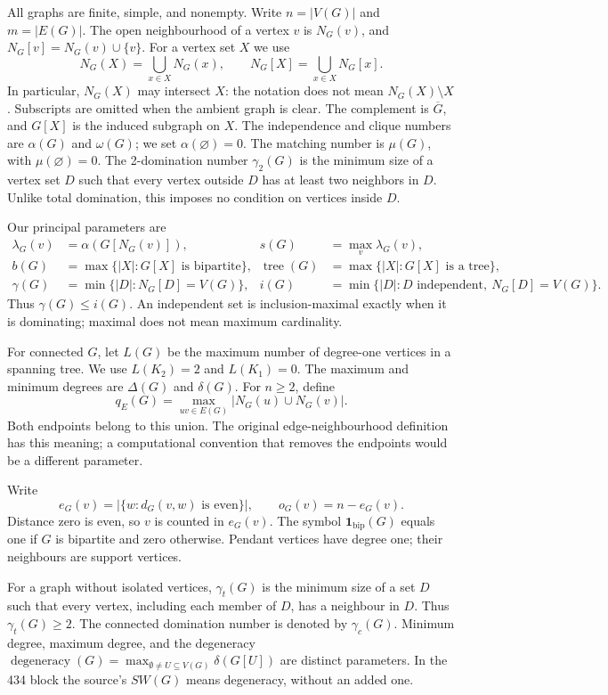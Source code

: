 \documentclass[11pt,a4paper]{article}
\theoremstyle{remark}
\newcommand{\tree}{\operatorname{tree}}
\newcommand{\bip}{\mathbf{1}_{\mathrm{bip}}}
\begin{document}
All graphs are finite, simple, and nonempty. Write $n=|V(G)|$ and
$m=|E(G)|$. The open neighbourhood of a vertex $v$ is $N_G(v)$, and
$N_G[v]=N_G(v)\cup\{v\}$. For a vertex set $X$ we use
\[
N_G(X)=\bigcup_{x\in X}N_G(x),\qquad
N_G[X]=\bigcup_{x\in X}N_G[x].
\]
In particular, $N_G(X)$ may intersect $X$: the notation does not mean
$N_G(X)\setminus X$. Subscripts are omitted when the ambient graph is clear.
The complement is $\overline G$, and $G[X]$ is the induced subgraph on $X$.
The independence and clique numbers are $\alpha(G)$ and $\omega(G)$;
we set $\alpha(\varnothing)=0$.
The matching number is $\mu(G)$, with $\mu(\varnothing)=0$.
The 2-domination number $\gamma_2(G)$ is the minimum size of a vertex set
$D$ such that every vertex outside $D$ has at least two neighbors in $D$.
Unlike total domination, this imposes no condition on vertices inside $D$.


Our principal parameters are
\begin{align*}
\lambda_G(v)&=\alpha(G[N_G(v)]),&
s(G)&=\max_v\lambda_G(v),\\
b(G)&=\max\{|X|:G[X]\text{ is bipartite}\},&
\tree(G)&=\max\{|X|:G[X]\text{ is a tree}\},\\
\gamma(G)&=\min\{|D|:N_G[D]=V(G)\},&
i(G)&=\min\{|D|:D\text{ independent},\ N_G[D]=V(G)\}.
\end{align*}
Thus $\gamma(G)\le i(G)$. An independent set is inclusion-maximal exactly
when it is dominating; maximal does not mean maximum cardinality.

For connected $G$, let $L(G)$ be the maximum number of degree-one vertices
in a spanning tree. We use $L(K_2)=2$ and $L(K_1)=0$.
The maximum and minimum degrees are $\Delta(G)$ and $\delta(G)$.
For $n\ge2$, define
\[
q_E(G)=\max_{uv\in E(G)}|N_G(u)\cup N_G(v)|.
\]
Both endpoints belong to this union. The original edge-neighbourhood
definition has this meaning; a computational convention that removes the
endpoints would be a different parameter.

Write
\[
e_G(v)=|\{w:d_G(v,w)\text{ is even}\}|,\qquad
o_G(v)=n-e_G(v).
\]
Distance zero is even, so $v$ is counted in $e_G(v)$. The symbol
$\bip(G)$ equals one if $G$ is bipartite and zero otherwise.
Pendant vertices have degree one; their neighbours are support vertices.


For a graph without isolated vertices, $\gamma_t(G)$ is the minimum size
of a set $D$ such that every vertex, including each member of $D$, has a
neighbour in $D$. Thus $\gamma_t(G)\ge2$. The connected domination number
is denoted by $\gamma_c(G)$. Minimum degree, maximum degree, and the
degeneracy $\operatorname{degeneracy}(G)=\max_{\emptyset\ne U\subseteq V(G)}
\delta(G[U])$ are distinct parameters. In the 434 block the source's
$SW(G)$ means degeneracy, without an added one.
\end{document}
